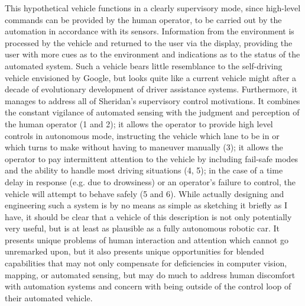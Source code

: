 This hypothetical vehicle functions in a clearly supervisory mode,
since high-level commands can be provided by the human operator, to be
carried out by the automation in accordance with its sensors.
Information from the environment is processed by the vehicle and
returned to the user via the display, providing the user with more
cues as to the environment and indications as to the status of the
automated system. Such a vehicle bears little resemblance to the
self-driving vehicle envisioned by Google, but looks quite like a
current vehicle might after a decade of evolutionary development of
driver assistance systems. Furthermore, it manages to address all of
Sheridan's supervisory control motivations. It combines the constant
vigilance of automated sensing with the judgment and perception of the
human operator (1 and 2); it allows the operator to provide high level
controls in autonomous mode, instructing the vehicle which lane to be
in or which turns to make without having to maneuver manually (3); it
allows the operator to pay intermittent attention to the vehicle by
including fail-safe modes and the ability to handle most driving
situations (4, 5); in the case of a time delay in response (e.g. due
to drowsiness) or an
operator's failure to control, the vehicle will attempt to behave
safely (5 and 6). While actually designing and engineering such a
system is by no means as simple as sketching it briefly as I have, it
should be clear that a vehicle of this description is not only
potentially very useful, but is at least as plausible as a fully
autonomous robotic car. It presents unique problems of human
interaction and attention which cannot go unremarked upon, but it also
presents unique opportunities for blended 
capabilities that may not only compensate for deficiencies in computer
vision, mapping, or automated sensing, but may do much to address
human discomfort with automation systems and concern with being
outside of the control loop of their automated vehicle.

